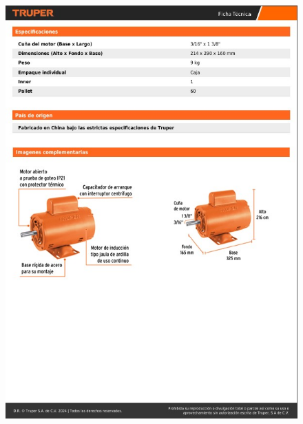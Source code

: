\begin{figure}[!htb]
    \centering
    \includegraphics[width=\linewidth]{imagenes/MotoresComercialesTruper2.jpg}
    \label{fig:DecayCurve}
\end{figure}
\FloatBarrier